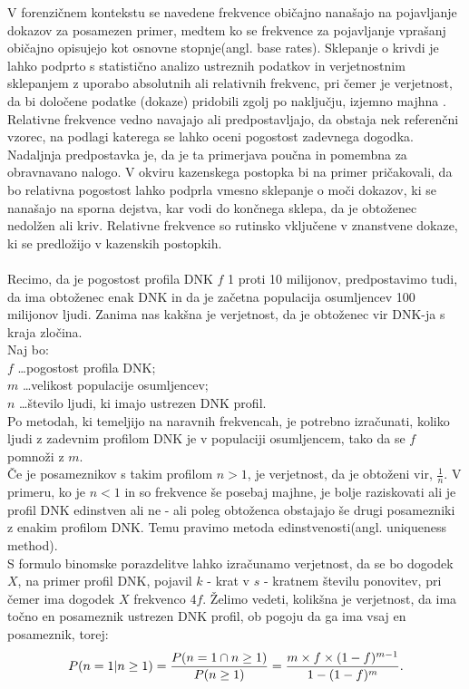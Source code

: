 \documentclass[12pt,a4paper]{amsart}
\theoremstyle{definition} %
\theoremstyle{plain} %
\begin{document}
V forenzičnem kontekstu se navedene frekvence običajno nanašajo na pojavljanje dokazov za posamezen primer, medtem ko se frekvence za pojavljanje vprašanj običajno opisujejo kot osnovne stopnje(angl. base rates). Sklepanje o krivdi je lahko podprto 
s statistično analizo ustreznih podatkov in verjetnostnim sklepanjem z uporabo absolutnih ali relativnih frekvenc, pri čemer je verjetnost, da bi določene podatke (dokaze) pridobili zgolj po naključju, izjemno majhna . Relativne frekvence vedno 
navajajo ali predpostavljajo, da obstaja nek referenčni vzorec, na podlagi katerega se lahko oceni pogostost zadevnega dogodka. Nadaljnja predpostavka je, da je ta primerjava poučna in pomembna za obravnavano nalogo. V okviru kazenskega postopka 
bi na primer pričakovali, da bo relativna pogostost lahko podprla vmesno sklepanje o moči dokazov, ki se nanašajo na sporna dejstva, kar vodi do končnega sklepa, da je obtoženec nedolžen ali kriv. Relativne frekvence so rutinsko vključene v znanstvene 
dokaze, ki se predložijo v kazenskih postopkih.\\\\
Recimo, da je pogostost profila DNK $f$ 1 proti 10 milijonov, predpostavimo tudi, da ima obtoženec enak DNK in da je začetna 
populacija osumljencev 100 milijonov ljudi. Zanima nas kakšna je verjetnost, da je obtoženec vir DNK-ja s kraja zločina. \\

Naj bo: \\
$f$ \dots pogostost profila DNK;\\
$m$ \dots velikost populacije osumljencev; \\
$n$ \dots število ljudi, ki imajo ustrezen DNK profil. \\
Po metodah, ki temeljijo na naravnih frekvencah, je potrebno izračunati, koliko ljudi z zadevnim profilom DNK je v populaciji osumljencem, tako 
da se $f$ pomnoži z $m$.  \\
Če je posameznikov s takim profilom $n > 1$, je verjetnost, da je obtoženi vir, $\frac{1}{n}$. V primeru, ko je $n < 1$ in so frekvence še 
posebaj majhne, je bolje raziskovati ali je profil DNK edinstven ali ne - ali poleg obtoženca obstajajo še drugi posamezniki z enakim 
profilom DNK. Temu pravimo metoda edinstvenosti(angl. uniqueness method). \\

S formulo binomske porazdelitve lahko izračunamo verjetnost, da se bo dogodek $X$, na primer profil DNK, pojavil $k$ - krat v $s$ - kratnem 
številu ponovitev, pri čemer ima dogodek $X$ frekvenco 4$f$. Želimo vedeti, kolikšna je verjetnost, da ima točno en posameznik ustrezen DNK 
profil, ob pogoju da ga ima vsaj en posameznik, torej: \vspace{3mm}
\[P(n = 1 \lvert n \ge 1) = \frac{P(n=1 \cap n \ge 1)}{P(n \ge 1)} = \frac{m \times f \times (1 - f)^{m-1}}{1 - (1-f)^m}. \vspace{3mm}\]
\end{document}
